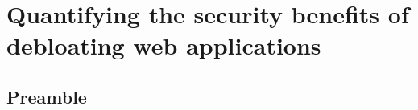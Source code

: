 \chapter{Quantifying the security benefits of debloating web applications}
\label{chap:lim}
\section*{Preamble}












